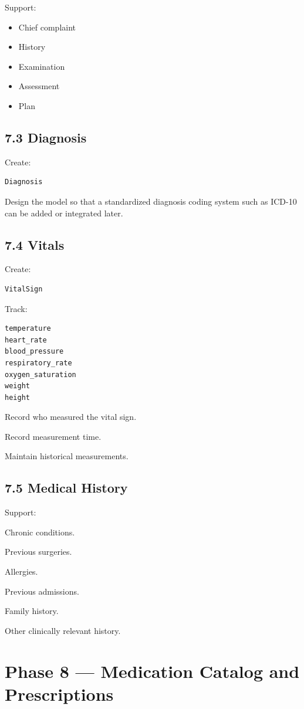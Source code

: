 \documentclass[11pt,a4paper]{article}
\newcommand{\task}[1]{\item[$\square$] #1}
\begin{document}
Support:

\begin{itemize}
    \item Chief complaint
    \item History
    \item Examination
    \item Assessment
    \item Plan
\end{itemize}

\subsection{7.3 Diagnosis}

Create:

\begin{lstlisting}
Diagnosis
\end{lstlisting}

Design the model so that a standardized diagnosis coding system such as
ICD-10 can be added or integrated later.

\subsection{7.4 Vitals}

Create:

\begin{lstlisting}
VitalSign
\end{lstlisting}

Track:

\begin{lstlisting}
temperature
heart_rate
blood_pressure
respiratory_rate
oxygen_saturation
weight
height
\end{lstlisting}

\task{Record who measured the vital sign.}
\task{Record measurement time.}
\task{Maintain historical measurements.}

\subsection{7.5 Medical History}

Support:

\task{Chronic conditions.}
\task{Previous surgeries.}
\task{Allergies.}
\task{Previous admissions.}
\task{Family history.}
\task{Other clinically relevant history.}

\section{Phase 8 --- Medication Catalog and Prescriptions}
\end{document}
